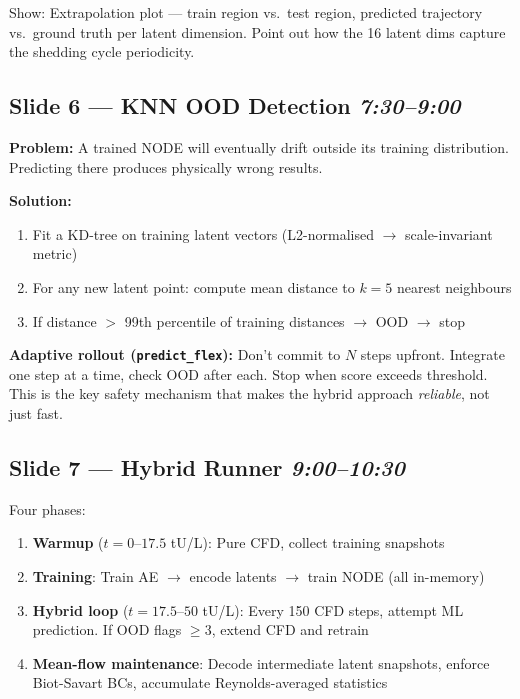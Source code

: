 \documentclass[11pt, a4paper]{article}
\begin{document}
Show: Extrapolation plot --- train region vs.\ test region, predicted trajectory
vs.\ ground truth per latent dimension. Point out how the 16 latent dims capture
the shedding cycle periodicity.

\subsection*{Slide 6 --- KNN OOD Detection \hfill \normalfont\textit{7:30--9:00}}

\textbf{Problem:} A trained NODE will eventually drift outside its training distribution.
Predicting there produces physically wrong results.

\textbf{Solution:}
\begin{enumerate}
  \item Fit a KD-tree on training latent vectors (L2-normalised $\to$ scale-invariant metric)
  \item For any new latent point: compute mean distance to $k=5$ nearest neighbours
  \item If distance $>$ 99th percentile of training distances $\to$ OOD $\to$ stop
\end{enumerate}

\textbf{Adaptive rollout (\texttt{predict\_flex}):} Don't commit to $N$ steps upfront.
Integrate one step at a time, check OOD after each. Stop when score exceeds threshold.
This is the key safety mechanism that makes the hybrid approach \emph{reliable}, not just fast.

\subsection*{Slide 7 --- Hybrid Runner \hfill \normalfont\textit{9:00--10:30}}

Four phases:
\begin{enumerate}
  \item \textbf{Warmup} ($t = 0$--$17.5$ tU/L): Pure CFD, collect training snapshots
  \item \textbf{Training}: Train AE $\to$ encode latents $\to$ train NODE (all in-memory)
  \item \textbf{Hybrid loop} ($t = 17.5$--$50$ tU/L): Every 150 CFD steps, attempt ML
        prediction. If OOD flags $\geq 3$, extend CFD and retrain
  \item \textbf{Mean-flow maintenance}: Decode intermediate latent snapshots, enforce
        Biot-Savart BCs, accumulate Reynolds-averaged statistics
\end{enumerate}
\end{document}

